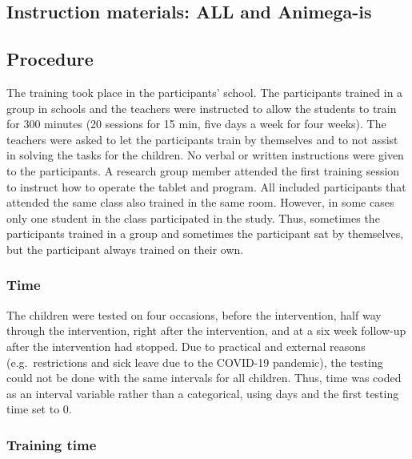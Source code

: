 \documentclass[
  english,
  ,man]{apa6}
\begin{document}
\hypertarget{instruction-materials-all-and-animega-is}{%
\subsection{Instruction materials: ALL and Animega-is}\label{instruction-materials-all-and-animega-is}}

\hypertarget{procedure}{%
\subsection{Procedure}\label{procedure}}

The training took place in the participants' school. The participants trained in a group in schools and the teachers were instructed to allow the students to train for 300 minutes (20 sessions for 15 min, five days a week for four weeks). The teachers were asked to let the participants train by themselves and to not assist in solving the tasks for the children. No verbal or written instructions were given to the participants. A research group member attended the first training session to instruct how to operate the tablet and program. All included participants that attended the same class also trained in the same room. However, in some cases only one student in the class participated in the study. Thus, sometimes the participants trained in a group and sometimes the participant sat by themselves, but the participant always trained on their own.

\hypertarget{time}{%
\subsubsection{Time}\label{time}}

The children were tested on four occasions, before the intervention, half way through the intervention, right after the intervention, and at a six week follow-up after the intervention had stopped. Due to practical and external reasons (e.g.~restrictions and sick leave due to the COVID-19 pandemic), the testing could not be done with the same intervals for all children. Thus, time was coded as an interval variable rather than a categorical, using days and the first testing time set to 0.

\hypertarget{training-time}{%
\subsubsection{Training time}\label{training-time}}
\end{document}
